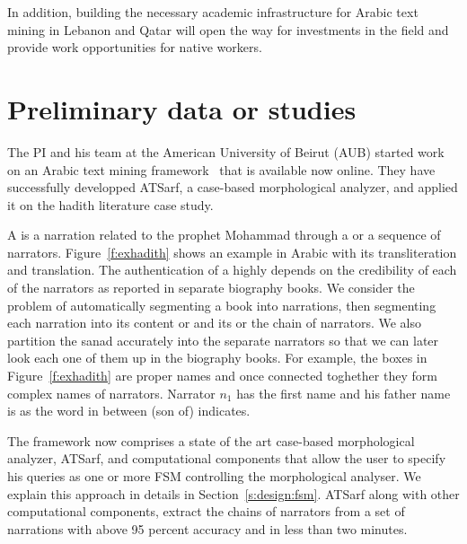 \documentclass[12pt]{article}
\newcommand{\noArRL}[1]{\arabfalse\RL{#1}\arabtrue}
\newcommand{\noTrRL}[1]{\transfalse\RL{#1}\transtrue}
\begin{document}
In addition, building the necessary academic 
infrastructure for Arabic text mining in Lebanon and Qatar will 
open the way for investments in the field and provide work 
opportunities for native workers.

\pagebreak

\section{Preliminary data or studies}
\label{s:prelim}

The PI and his team at the American University of Beirut (AUB)
started work on an Arabic text mining framework~\cite{ATMine09}
that is available now online.
They have successfully developped ATSarf, a case-based morphological 
analyzer, and applied it on the hadith literature case study. 

A  is a narration related to the prophet Mohammad
through a  or a sequence of narrators. 
Figure~\ref{f:exhadith} shows an example \noArRL{.hady_t} in Arabic with its 
transliteration and translation. 
The authentication of a \noArRL{.hady_t} highly depends on the credibility
of each of the narrators as reported in separate biography 
books. 
We consider the problem of automatically segmenting
a \noArRL{.hady_t} book into narrations, then segmenting each 
narration into
its content or  and its \noArRL{sanad} or the
chain of narrators.
We also partition the sanad accurately into the 
separate narrators so that we can later look each one of them 
up in the biography books. 
For example, the boxes in Figure~\ref{f:exhadith} are proper names 
and once
connected toghether they form complex names of narrators. 
Narrator $n_1$ has the first name \noTrRL{qtybT} and his father 
name is \noTrRL{s`yd} as the word in between 
\noTrRL{bn} (son of) indicates. 

\transfalse
\begin{figure}[tb]
\end{figure}
\transtrue

The framework now comprises a state of the art
case-based morphological analyzer, ATSarf, 
and computational components that allow the user to
specify his queries as one or more FSM
controlling the morphological analyser.
We explain this approach in details in Section~\ref{s:design:fsm}.
ATSarf along with other computational components, 
extract the chains of narrators from a set of narrations
with above 95 percent accuracy and in less than two minutes. 
\end{document}
